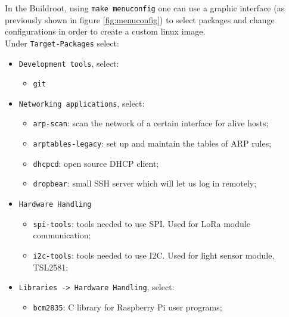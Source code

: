 In the Buildroot, using \verb|make menuconfig| one can use a graphic interface (as previously shown in figure \ref{fig:menuconfig}) to select packages and change configurations in order to create a custom linux image.\\

Under \verb|Target-Packages| select:
\begin{itemize}
	\item \verb|Development tools|, select:
	\begin{itemize}
		\item \verb|git|
	\end{itemize}

	\item \verb|Networking applications|, select:
	\begin{itemize}
		\item \verb|arp-scan|: scan the network of a certain interface for alive hosts;
		\item \verb|arptables-legacy|: set up and maintain the tables of ARP rules;
		\item \verb|dhcpcd|: open source DHCP client;
		\item \verb|dropbear|: small SSH server which will let us log in remotely;
	\end{itemize}

	\item \verb|Hardware Handling|
	\begin{itemize}
		\item \verb|spi-tools|: tools needed to use SPI. Used for LoRa module communication;
		\item \verb|i2c-tools|: tools needed to use I2C. Used for light sensor module, TSL2581;
	\end{itemize}
	
	\item \verb|Libraries -> Hardware Handling|, select:
	\begin{itemize}
		\item \verb|bcm2835|: C library for Raspberry Pi user programs;
	\end{itemize}
\end{itemize}